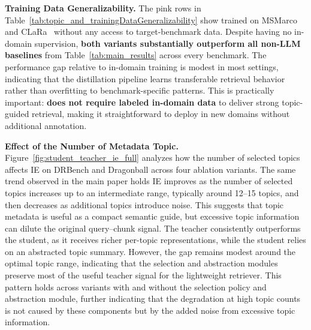 \noindent
\textbf{Training Data Generalizability. }
The \colorbox{pink!15}{pink rows} in Table~\ref{tab:topic_and_trainingDataGeneralizability} show \name{} trained on MSMarco~\cite{DBLP:journals/corr/NguyenRSGTMD16} and CLaRa~\cite{he2025clarabridgingretrievalgeneration} without any access to target-benchmark data. Despite having no in-domain supervision, \textbf{both variants substantially outperform all non-LLM baselines} from Table~\ref{tab:main_results} across every benchmark. The performance gap relative to in-domain training is modest in most settings, indicating that the distillation pipeline learns transferable retrieval behavior rather than overfitting to benchmark-specific patterns. This is practically important: \name{} \textbf{does not require labeled in-domain data} to deliver strong topic-guided retrieval, making it straightforward to deploy in new domains without additional annotation.

\noindent
\textbf{Effect of the Number of Metadata Topic. }
Figure~\ref{fig:student_teacher_ie_full} analyzes how the number of selected topics affects IE on DRBench and Dragonball across four ablation variants. The same trend observed in the main paper holds IE improves as the number of selected topics increases up to an intermediate range, typically around 12--15 topics, and then decreases as additional topics introduce noise. This suggests that topic metadata is useful as a compact semantic guide, but excessive topic information can dilute the original query--chunk signal. The teacher consistently outperforms the student, as it receives richer per-topic representations, while the student relies on an abstracted topic summary. However, the gap remains modest around the optimal topic range, indicating that the selection and abstraction modules preserve most of the useful teacher signal for the lightweight retriever. This pattern holds across variants with and without the selection policy and abstraction module, further indicating that the degradation at high topic counts is not caused by these components but by the added noise from excessive topic information.


